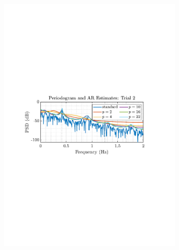 \documentclass[12pt]{article}
\begin{document}
\begin{figure}[H]
\begin{subfigure}{0.49\textwidth}
				\includegraphics[trim={2.2cm 11.2cm 3.15cm  11.2cm}, clip, width=\textwidth]{../MATLAB/figures/q1_5c_fig02.pdf} 
			\end{subfigure}
			

\end{figure}
\end{document}

